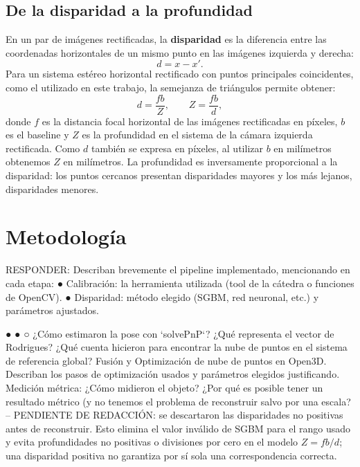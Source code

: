 \documentclass[a4paper,11pt]{article}
\begin{document}
\subsection{De la disparidad a la profundidad}
En un par de imágenes rectificadas, la \textbf{disparidad} es la diferencia entre las coordenadas horizontales de un mismo punto en las imágenes izquierda y derecha:
\begin{equation}
d = x-x'.
\end{equation}
Para un sistema estéreo horizontal rectificado con puntos principales coincidentes, como el utilizado en este trabajo, la semejanza de triángulos permite obtener:
\begin{equation}
d = \frac{fb}{Z}, \qquad Z = \frac{fb}{d},
\end{equation}
donde $f$ es la distancia focal horizontal de las imágenes rectificadas en píxeles, $b$ es el baseline y $Z$ es la profundidad en el sistema de la cámara izquierda rectificada. Como $d$ también se expresa en píxeles, al utilizar $b$ en milímetros obtenemos $Z$ en milímetros. La profundidad es inversamente proporcional a la disparidad: los puntos cercanos presentan disparidades mayores y los más lejanos, disparidades menores.

\section{Metodología}
RESPONDER:
Describan brevemente el pipeline implementado, mencionando en cada etapa:
●
Calibración: la herramienta utilizada (tool de la cátedra o funciones de OpenCV).
●
Disparidad: método elegido (SGBM, red neuronal, etc.) y parámetros ajustados.

●
●
○
¿Cómo estimaron la pose con
`solvePnP`? ¿Qué representa el vector de
Rodrigues? ¿Qué cuenta hicieron para encontrar la nube de puntos en el
sistema de referencia global?
Fusión y Optimización de nube de puntos en Open3D. Describan los pasos de
optimización usados y parámetros elegidos justificando.
Medición métrica: ¿Cómo midieron el objeto? ¿Por qué es posible tener un resultado
métrico (y no tenemos el problema de reconstruir salvo por una escala?
-- PENDIENTE DE REDACCIÓN: se descartaron las disparidades no positivas antes de reconstruir. Esto elimina el valor inválido de SGBM para el rango usado y evita profundidades no positivas o divisiones por cero en el modelo $Z=fb/d$; una disparidad positiva no garantiza por sí sola una correspondencia correcta.
\end{document}
